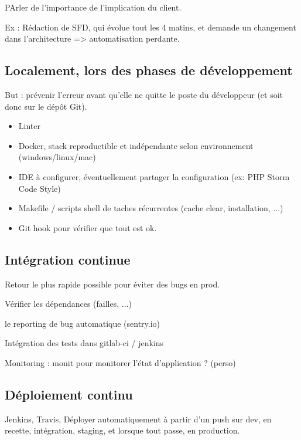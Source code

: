 PArler de l'importance de l'implication du client. 

Ex :  Rédaction de SFD, qui évolue tout les 4 matins, et demande un changement dans l'architecture => automatisation perdante.


\subsection{Localement, lors des phases de développement}

But : prévenir l'erreur avant qu'elle ne quitte le poste du développeur (et soit donc sur le dépôt Git).

 \begin{itemize}
 	\item Linter
 	\item Docker, stack reproductible et indépendante selon environnement (windows/linux/mac) 
 	\item IDE à configurer, éventuellement partager la configuration (ex: PHP Storm Code Style)
 	\item Makefile / scripts shell de taches récurrentes (cache clear, installation, ...)
 	\item Git hook pour vérifier que tout est ok.
 \end{itemize}

\subsection{Intégration continue}

Retour le plus rapide possible pour éviter des bugs en prod. 

Vérifier les dépendances (failles, ...)

le reporting de bug automatique (sentry.io)

Intégration des tests dans gitlab-ci / jenkins

Monitoring : monit pour monitorer l'état d'application ? (perso)

\subsection{Déploiement continu}

Jenkins, Travis, Déployer automatiquement à partir d'un push sur dev, en recette, intégration, staging, et lorsque tout passe, en production.


